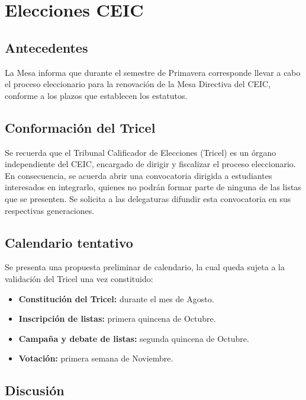 \documentclass[12pt,letterpaper]{article}
\newif\ifrevision
\newcommand{\dato}[1]{\ifrevision\textcolor[HTML]{C0392B}{#1}\else#1\fi}
\begin{document}
\section{Elecciones CEIC}

\subsection{Antecedentes}

La Mesa informa que durante el semestre de Primavera corresponde llevar a cabo el proceso eleccionario para la renovación de la Mesa Directiva del CEIC, conforme a los plazos que establecen los estatutos.

\subsection{Conformación del Tricel}

Se recuerda que el Tribunal Calificador de Elecciones (Tricel) es un órgano independiente del CEIC, encargado de dirigir y fiscalizar el proceso eleccionario. En consecuencia, se acuerda abrir una convocatoria dirigida a estudiantes interesados en integrarlo, quienes no podrán formar parte de ninguna de las listas que se presenten. Se solicita a las delegaturas difundir esta convocatoria en sus respectivas generaciones.

\subsection{Calendario tentativo}

Se presenta una propuesta preliminar de calendario, la cual queda sujeta a la validación del Tricel una vez constituido:

\begin{itemize}
  \item \textbf{Constitución del Tricel:} \dato{durante el mes de Agosto.}
  \item \textbf{Inscripción de listas:} \dato{primera quincena de Octubre.}
  \item \textbf{Campaña y debate de listas:} \dato{segunda quincena de Octubre.}
  \item \textbf{Votación:} \dato{primera semana de Noviembre.}
\end{itemize}

\subsection{Discusión}
\end{document}

